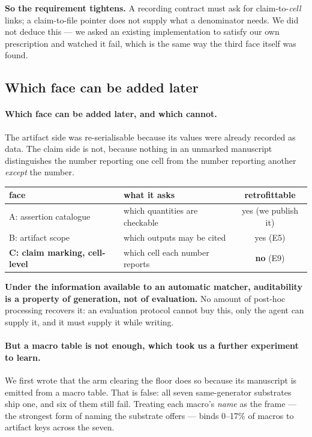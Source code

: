 \documentclass[10pt]{article}
\newcommand{\RM}[1]{{#1}}
\begin{document}
\textbf{So the requirement tightens.} A recording contract must ask for
claim-to-\emph{cell} links; a claim-to-file pointer does not supply what a
denominator needs. We did not deduce this --- we asked an existing
implementation to satisfy our own prescription and watched it fail, which is the
same way the third face itself was found.



\subsection{Which face can be added later}

\paragraph{Which face can be added later, and which cannot.} The artifact side
was re-serialisable because its values were already recorded as data. The claim
side is not, because nothing in an unmarked manuscript distinguishes the number
reporting one cell from the number reporting another \emph{except} the number.

\begin{center}
\small
\begin{tabular}{@{}llc@{}}
\toprule
face & what it asks & retrofittable \\
\midrule
A: assertion catalogue & which quantities are checkable & \RM{yes} (we publish it) \\
B: artifact scope & which outputs may be cited & \RM{yes} (E5) \\
\textbf{C: claim marking, cell-level} & which cell each number reports & \RM{\textbf{no}} (E9) \\
\bottomrule
\end{tabular}
\end{center}

\noindent \textbf{Under the information available to an automatic matcher,
auditability is a property of generation, not of
evaluation.} No amount of post-hoc processing recovers it: an evaluation
protocol cannot buy this, only the agent can supply it, and it must supply it
while writing.

\paragraph{But a macro table is not enough, which took us a further experiment
to learn.} We first wrote that the arm clearing the floor does so because its
manuscript is emitted from a macro table. That is false: \RM{all seven}
same-generator substrates ship one, and six of them still fail. Treating each
macro's \emph{name} as the frame --- the strongest form of naming the substrate
offers --- binds \RM{0--17\%} of macros to artifact keys across the seven.
\end{document}
